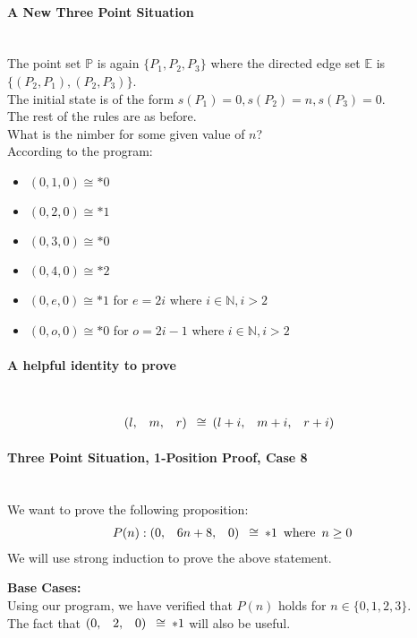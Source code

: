 \documentclass{article}
\makeatletter
\newcommand{\N}{\mathbb{N}}
\newcommand{\game}[3]{\begin{array}{@{}*6r}(#1, & #2, & #3)\end{array}}
\newcommand{\gcong}{\cong\:}
\makeatother
\begin{document}
\paragraph{A New Three Point Situation}\mbox{}\\
The point set $\mathbb{P}$ is again $\{P_1, P_2, P_3\}$ where
the directed edge set $\mathbb{E}$ is $\{(P_2, P_1), (P_2, P_3)\}$. \\
The initial state is of the form $s(P_1) = 0, s(P_2) = n, s(P_3) = 0$. \\
The rest of the rules are as before. \\
What is the nimber for some given value of $n$? \\
According to the program:
\begin{itemize}
  \item $(0, 1, 0) \cong *0$
  \item $(0, 2, 0) \cong *1$
  \item $(0, 3, 0) \cong *0$
  \item $(0, 4, 0) \cong *2$
  \item $(0, e, 0) \cong *1$ for $e = 2i$ where $i \in \N, i > 2$
  \item $(0, o, 0) \cong *0$ for $o = 2i - 1$ where $i \in \N, i > 2$
\end{itemize}

\paragraph{A helpful identity to prove}\mbox{}\\
\begin{equation*}
  \game{l}{m}{r} \gcong \game{l + i}{m + i}{r + i}
\end{equation*}

\newpage
\paragraph{Three Point Situation, 1-Position Proof, Case 8}\mbox{}\\
We want to prove the following proposition:
\begin{equation*}
  P(n) : \game{0}{6n + 8}{0} \gcong *1 \enspace \text{where} \enspace n \geq 0
\end{equation*}
We will use strong induction to prove the above statement.

\bigskip
\textbf{Base Cases:} \\
Using our program, we have verified that $P(n)$ holds for
$n \in \{0, 1, 2, 3\}$. \\
The fact that $\game{0}{2}{0} \gcong *1$ will also be useful.
\end{document}
